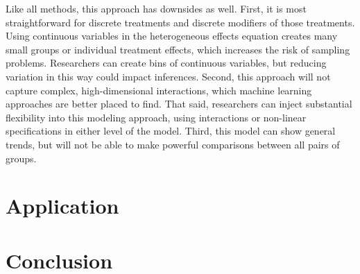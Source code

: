 \documentclass[12pt]{article}
\begin{document}
Like all methods, this approach has downsides as well. 
First, it is most straightforward for discrete treatments and discrete modifiers of those treatments. 
Using continuous variables in the heterogeneous effects equation creates many small groups or individual treatment effects, which increases the risk of sampling problems. 
Researchers can create bins of continuous variables, but reducing variation in this way could impact inferences. 
Second, this approach will not capture complex, high-dimensional interactions, which machine learning approaches are better placed to find. 
That said, researchers can inject substantial flexibility into this modeling approach, using interactions or non-linear specifications in either level of the model. 
Third, this model can show general trends, but will not be able to make powerful comparisons between all pairs of groups. 




\section{Application} 



\section{Conclusion}


\newpage
\singlespace
 
 
\end{document}
